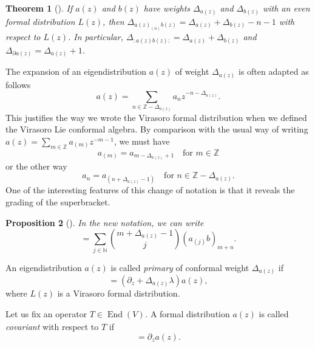 \documentclass[a4paper, 12pt, reqno]{amsart}
\newtheorem{theorem}{Theorem}[section]
\newtheorem{proposition}[theorem]{Proposition}
\theoremstyle{remark}
\DeclareMathOperator{\End}{End}
\DeclareMathOperator{\zero}{\overline{0}}
\begin{document}
\begin{theorem}[{\cite[Proposition 3.7.4]{nozaradan_introduction_2008}}]
  \label{thr:13}
  If $a(z)$ and $b(z)$ have weights $\Delta_{a(z)}$ and $\Delta_{b(z)}$ with an even formal distribution $L(z)$, then $\Delta_{a(z)_{(n)}b(z)} = \Delta_{a(z)} + \Delta_{b(z)} - n - 1$ with respect to $L(z)$.
  In particular, $\Delta_{:a(z)b(z):} = \Delta_{a(z)} + \Delta_{b(z)}$ and $\Delta_{\partial a(z)} = \Delta_{a(z)} + 1$.
\end{theorem}

The expansion of an eigendistribution $a(z)$ of weight $\Delta_{a(z)}$ is often adapted as follows
\begin{equation*}
  a(z) = \sum_{n \in \mathbb{Z} - \Delta_{a(z)}}a_nz^{-n - \Delta_{a(z)}}.
\end{equation*}
This justifies the way we wrote the Virasoro formal distribution when we defined the Virasoro Lie conformal algebra.
By comparison with the usual way of writing $a(z) = \sum_{m \in \mathbb{Z}}a_{(m)}z^{-m - 1}$, we must have
\begin{equation*}
  a_{(m)} = a_{m - \Delta_{a(z)} + 1} \quad \text{for $m \in \mathbb{Z}$}
\end{equation*}
or the other way
\begin{equation*}
  a_n = a_{(n + \Delta_{a(z)} - 1)} \quad \text{for $n \in \mathbb{Z} - \Delta_{a(z)}$}.
\end{equation*}
One of the interesting features of this change of notation is that it reveals the grading of the superbracket.

\begin{proposition}[{\cite[Proposition 3.7.6]{nozaradan_introduction_2008}}]
  \label{prp:8}
  In the new notation, we can write
  \begin{equation*}
    [a_m, b_n] = \sum_{j \in \mathbb{N}}\binom{m + \Delta_{a(z)} - 1}{j}(a_{(j)}b)_{m + n}.
  \end{equation*}
\end{proposition}

An eigendistribution $a(z)$ is called \emph{primary} of conformal weight $\Delta_{a(z)}$ if
\begin{equation*}
  [L(z)_{\lambda}a(z)] = (\partial_z + \Delta_{a(z)}\lambda)a(z),
\end{equation*}
where $L(z)$ is a Virasoro formal distribution.

Let us fix an operator $T \in \End(V)_{\zero}$.
A formal distribution $a(z)$ is called \emph{covariant} with respect to $T$ if
\begin{equation*}
  [T, a(z)] = \partial_za(z).
\end{equation*}
\end{document}

